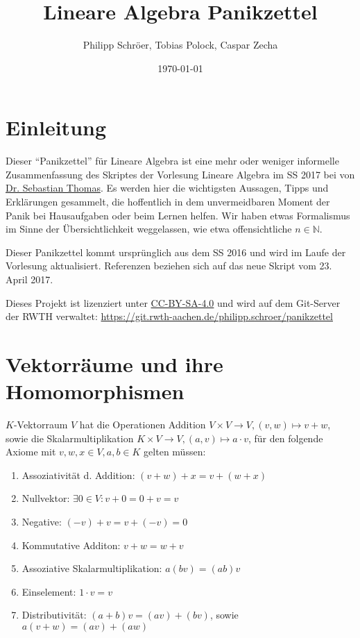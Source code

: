 \documentclass[11pt]{scrartcl}
\title{Lineare Algebra Panikzettel}
\author{Philipp Schröer, Tobias Polock, Caspar Zecha}
\date{\today}
\begin{document}
\maketitle

\setcounter{tocdepth}{2}
\tableofcontents

\section{Einleitung}

Dieser ``Panikzettel'' für Lineare Algebra ist eine mehr oder weniger informelle Zusammenfassung des Skriptes der Vorlesung Lineare Algebra im SS 2017 bei von \href{http://www.math.rwth-aachen.de/~Sebastian.Thomas/photo.jpg}{Dr. Sebastian Thomas}. Es werden hier die wichtigsten Aussagen, Tipps und Erklärungen gesammelt, die hoffentlich in dem unvermeidbaren Moment der Panik bei Hausaufgaben oder beim Lernen helfen. Wir haben etwas Formalismus im Sinne der Übersichtlichkeit weggelassen, wie etwa offensichtliche $n \in \mathbb{N}$.

Dieser Panikzettel kommt ursprünglich aus dem SS 2016 und wird im Laufe der Vorlesung aktualisiert. Referenzen beziehen sich auf das neue Skript vom 23. April 2017.

Dieses Projekt ist lizenziert unter \href{https://creativecommons.org/licenses/by-sa/4.0/}{CC-BY-SA-4.0} und wird auf dem Git-Server der RWTH verwaltet: \url{https://git.rwth-aachen.de/philipp.schroer/panikzettel}

\section{Vektorräume und ihre Homomorphismen}

$K$-Vektorraum $V$ hat die Operationen Addition  $V \times V \to V, (v,w) \mapsto v+w$, sowie die Skalarmultiplikation $K \times V \to V, (a,v) \mapsto a \cdot v  $, für den folgende Axiome mit $v, w, x \in V, a,b \in K$ gelten müssen:

\begin{enumerate}
\item Assoziativität d. Addition: $(v+w)+x = v+(w+x)$
\item Nullvektor: $\exists 0 \in V: v+0=0+v=v$
\item Negative: $(-v)+v=v+(-v)=0$
\item Kommutative Additon: $v+w=w+v$
\item Assoziative Skalarmultiplikation: $a(bv)=(ab)v$
\item Einselement: $1\cdot v=v$
\item Distributivität: $(a+b)v=(av)+(bv)$, sowie $a(v+w)=(av)+(aw)$
\end{enumerate}
\end{document}
